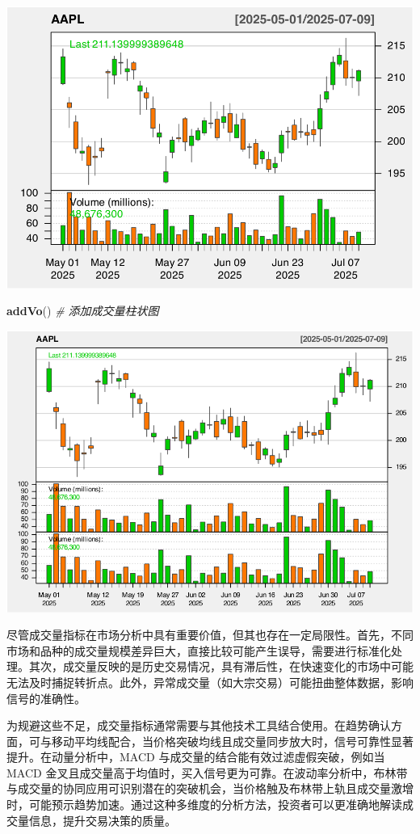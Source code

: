 \documentclass[]{ctexbook}
\newenvironment{Shaded}{\begin{snugshade}}{\end{snugshade}}
\newcommand{\CommentTok}[1]{\textcolor[rgb]{0.56,0.35,0.01}{\textit{#1}}}
\newcommand{\FunctionTok}[1]{\textcolor[rgb]{0.13,0.29,0.53}{\textbf{#1}}}
\newcommand{\NormalTok}[1]{#1}
\begin{document}
\includegraphics[width=0.9\linewidth]{quantmod_files/figure-latex/vo-1}

\begin{Shaded}
\begin{Highlighting}[]
\FunctionTok{addVo}\NormalTok{()  }\CommentTok{\# 添加成交量柱状图}
\end{Highlighting}
\end{Shaded}

\includegraphics[width=0.9\linewidth]{quantmod_files/figure-latex/vo-2}

尽管成交量指标在市场分析中具有重要价值，但其也存在一定局限性。首先，不同市场和品种的成交量规模差异巨大，直接比较可能产生误导，需要进行标准化处理。其次，成交量反映的是历史交易情况，具有滞后性，在快速变化的市场中可能无法及时捕捉转折点。此外，异常成交量（如大宗交易）可能扭曲整体数据，影响信号的准确性。

为规避这些不足，成交量指标通常需要与其他技术工具结合使用。在趋势确认方面，可与移动平均线配合，当价格突破均线且成交量同步放大时，信号可靠性显著提升。在动量分析中，MACD 与成交量的结合能有效过滤虚假突破，例如当 MACD 金叉且成交量高于均值时，买入信号更为可靠。在波动率分析中，布林带与成交量的协同应用可识别潜在的突破机会，当价格触及布林带上轨且成交量激增时，可能预示趋势加速。通过这种多维度的分析方法，投资者可以更准确地解读成交量信息，提升交易决策的质量。
\end{document}
